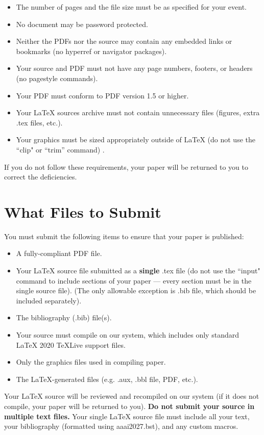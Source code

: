 \begin{itemize}
\item The number of pages and the file size must be as specified for your event.
\item No document may be password protected.
\item Neither the PDFs nor the source may contain any embedded links or bookmarks (no hyperref or navigator packages).
\item Your source and PDF must not have any page numbers, footers, or headers (no pagestyle commands).
\item Your PDF must conform to PDF version 1.5 or higher.
\item Your \LaTeX{} sources archive must not contain unnecessary files (figures, extra .tex files, etc.).
\item Your graphics must be sized appropriately outside of \LaTeX{} (do not use the ``clip" or ``trim'' command) .
\end{itemize}

If you do not follow these requirements, your paper will be returned to you to correct the deficiencies.

\section{What Files to Submit}
You must submit the following items to ensure that your paper is published:
\begin{itemize}
\item A fully-compliant PDF file.
\item Your \LaTeX{} source file submitted as a \textbf{single} .tex file (do not use the ``input" command to include sections of your paper --- every section must be in the single source file). (The only allowable exception is .bib file, which should be included separately).
\item The bibliography (.bib) file(s).
\item Your source must compile on our system, which includes only standard \LaTeX{} 2020 TeXLive support files.
\item Only the graphics files used in compiling paper.
\item The \LaTeX{}-generated files (e.g. .aux,  .bbl file, PDF, etc.).
\end{itemize}

Your \LaTeX{} source will be reviewed and recompiled on our system (if it does not compile, your paper will be returned to you). \textbf{Do not submit your source in multiple text files.} Your single \LaTeX{} source file must include all your text, your bibliography (formatted using aaai2027.bst), and any custom macros.

